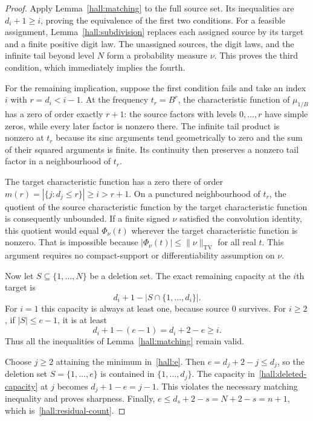 \documentclass[11pt,letterpaper]{article}
\theoremstyle{definition}
\theoremstyle{remark}
\begin{document}
\begin{proof}
Apply Lemma~\ref{hall:matching} to the full source set. Its inequalities
are $d_i+1\ge i$, proving the equivalence of the first two conditions.
For a feasible assignment, Lemma~\ref{hall:subdivision} replaces each
assigned source by its target and a finite positive digit law. The
unassigned sources, the digit laws, and the infinite tail beyond level $N$
form a probability measure $\nu$. This proves the third condition, which
immediately implies the fourth.

For the remaining implication, suppose the first condition fails and take
an index $i$ with $r=d_i<i-1$. At the frequency $t_r=B^r$, the
characteristic function of $\mu_{1/B}$ has a zero of order exactly $r+1$:
the source factors with levels $0,\ldots,r$ have simple zeros, while every
later factor is nonzero there. The infinite tail product is nonzero at
$t_r$ because its sinc arguments tend geometrically to zero and the sum
of their squared arguments is finite. Its continuity then preserves a
nonzero tail factor in a neighbourhood of $t_r$.

The target characteristic function has a zero there of order
$m(r)=|\{j:d_j\le r\}|\ge i>r+1$. On a punctured neighbourhood of
$t_r$, the quotient of the source characteristic function by the target
characteristic function is consequently unbounded. If a finite signed
$\nu$ satisfied the convolution identity, this quotient would equal
$\Phi_\nu(t)$ wherever the target characteristic function is nonzero.
That is impossible because
$|\Phi_\nu(t)|\le\|\nu\|_{\mathrm{TV}}$ for all real $t$.
This argument requires no compact-support or differentiability assumption
on $\nu$.

Now let $S\subseteq\{1,\ldots,N\}$ be a deletion set. The exact remaining
capacity at the $i$th target is
\begin{equation}
 d_i+1-|S\cap\{1,\ldots,d_i\}|.
 \label{hall:deleted-capacity}
\end{equation}
For $i=1$ this capacity is always at least one, because source $0$
survives. For $i\ge2$, if $|S|\le e-1$, it is at least
\[
 d_i+1-(e-1)=d_i+2-e\ge i.
\]
Thus all the inequalities of Lemma~\ref{hall:matching} remain valid.

Choose $j\ge2$ attaining the minimum in~\eqref{hall:e}. Then
$e=d_j+2-j\le d_j$, so the deletion set $S=\{1,\ldots,e\}$ is contained
in $\{1,\ldots,d_j\}$. The capacity in~\eqref{hall:deleted-capacity}
at $j$ becomes $d_j+1-e=j-1$. This violates the necessary matching
inequality and proves sharpness. Finally,
$e\le d_s+2-s=N+2-s=n+1$, which is~\eqref{hall:residual-count}.
\end{proof}
\end{document}
